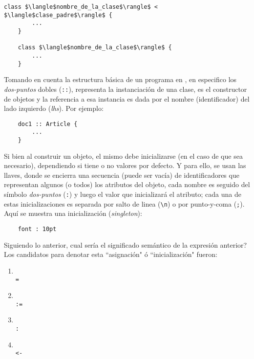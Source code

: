 \documentclass[12pt,letterpaper,titlepage,oneside,openright]{book}
\newcommand{\OhTeX}{%
    \makebox[0.76em][c]{O}%
    \makebox[0.25em][c]{%
        \raisebox{0.14em}[0em][0em]{%
            \fontsize{0.5em}{0cm}%
                \selectfont H%
        }%
    }%
    \makebox[1.35em][c]{\TeX}%
}
\newcommand{\ohtex}{\OhTeX\xspace}
\begin{document}
\begin{center}
\begin{lstlisting}[mathescape]
    class $\langle$nombre_de_la_clase$\rangle$ < $\langle$clase_padre$\rangle$ {
        ...
    }

    class $\langle$nombre_de_la_clase$\rangle$ {
        ...
    }
\end{lstlisting}
\end{center}


Tomando en cuenta la estructura básica de un programa en \ohtex, en especifico
los \textit{dos-puntos} dobles (\texttt{::}), representa la instanciación de
una clase, es el constructor de objetos y la referencia a esa instancia es dada
por el nombre (identificador) del lado izquierdo (\textit{lhs}). Por ejemplo:

\begin{center}
\begin{lstlisting}
    doc1 :: Article {
        ...
    }   
\end{lstlisting}
\end{center}

Si bien al construir un objeto, el mismo debe inicializarse (en el caso de que
sea necesario), dependiendo si tiene o no valores por defecto. Y para ello, se
usan las llaves, donde se encierra una secuencia (puede ser vacía) de
identificadores que representan algunos (o todos) los atributos del objeto, cada
nombre es seguido del símbolo \textit{dos-puntos} (\texttt{:}) y luego el valor
que inicializará el atributo; cada una de estas inicializaciones es separada por
salto de linea (\verb|\n|) o por punto-y-coma (\texttt{;}). Aquí se muestra una
inicialización (\textit{singleton}):

\begin{center}
\begin{lstlisting}
    font : 10pt
\end{lstlisting}
\end{center}

Siguiendo lo anterior, cual sería el significado semántico de la expresión
anterior? Los candidatos para denotar esta ``asignación" ó ``inicialización"
fueron:

\newpage

\begin{center}
\begin{enumerate}[label=Opción \alph*:, leftmargin=7em]
    \item \hfill \\
          \texttt{=}
    \item \hfill \\
          \texttt{:=}
    \item \hfill \\
          \texttt{:}
    \item \hfill \\
          \texttt{<-}
\end{enumerate}
\end{center}
\end{document}
